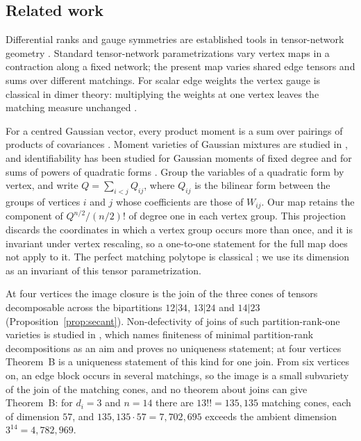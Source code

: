 \documentclass[11pt]{article}
\theoremstyle{remark}\newtheorem{remark}[theorem]{Remark}
\begin{document}
\subsection*{Related work}
Differential ranks and gauge symmetries are established tools in tensor-network geometry \cite{bdg}. Standard tensor-network parametrizations vary vertex maps in a contraction along a fixed network; the present map varies shared edge tensors and sums over different matchings. For scalar edge weights the vertex gauge is classical in dimer theory: multiplying the weights at one vertex leaves the matching measure unchanged \cite[Section~3.2]{kenyon}.

For a centred Gaussian vector, every product moment is a sum over pairings of products of covariances \cite{isserlis}. Moment varieties of Gaussian mixtures are studied in \cite{afs}, and identifiability has been studied for Gaussian moments of fixed degree and for sums of powers of quadratic forms \cite{blomenhofer,centeredGaussian}. Group the variables of a quadratic form by vertex, and write $Q=\sum_{i<j}Q_{ij}$, where $Q_{ij}$ is the bilinear form between the groups of vertices $i$ and $j$ whose coefficients are those of $W_{ij}$. Our map retains the component of $Q^{n/2}/(n/2)!$ of degree one in each vertex group. This projection discards the coordinates in which a vertex group occurs more than once, and it is invariant under vertex rescaling, so a one-to-one statement for the full map does not apply to it. The perfect matching polytope is classical \cite{elp}; we use its dimension as an invariant of this tensor parametrization.

At four vertices the image closure is the join of the three cones of tensors decomposable across the bipartitions $12|34$, $13|24$ and $14|23$ (Proposition~\ref{prop:secant}). Non-defectivity of joins of such partition-rank-one varieties is studied in \cite{bc-joins}, which names finiteness of minimal partition-rank decompositions as an aim and proves no uniqueness statement; at four vertices Theorem~B is a uniqueness statement of this kind for one join. From six vertices on, an edge block occurs in several matchings, so the image is a small subvariety of the join of the matching cones, and no theorem about joins can give Theorem~B: for $d_i=3$ and $n=14$ there are $13!!=135{,}135$ matching cones, each of dimension $57$, and $135{,}135\cdot57=7{,}702{,}695$ exceeds the ambient dimension $3^{14}=4{,}782{,}969$.
\end{document}
